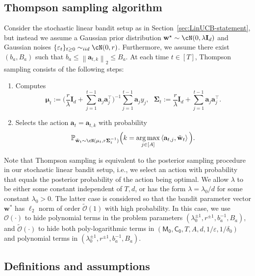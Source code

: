 \documentclass[10pt]{article}
\newcommand{\id}{\bI}
\newcommand{\eps}{\varepsilon}
\DeclareMathOperator*{\argmax}{arg\,max}
\newcommand{\norm}[1]{\left\|{#1}\right\|}
\newcommand{\ltwo}[1]{\norm{#1}_2}
\renewcommand{\cO}{\mathcal{O}}
\newcommand{\<}{\left\langle}
\renewcommand{\>}{\right\rangle}
\renewcommand{\P}{\mathbb{P}}
\newcommand{\Tpsmean}{{{\mathbf\mu}}}
\newcommand{\Tpscov}{{{\mathbf\Sigma}}}
\newcommand{\Tpssam}{{\tilde\bw}}
\newcommand{\Tpspar}{{\lambda}}
\newcommand{\Tpsparn}{{r}}
\newcommand{\tcO}{{\tilde{\mathcal O}}}
\newcommand{\totlen}{{T}}
\newcommand{\neuron}{{\mathsf{M_0}}}
\newcommand{\weightn}{{{\mathsf{C_0}}}}
\def\bI{{\mathbf I}}
\def\ba{{\mathbf a}}
\def\bw{{\mathbf w}}
\begin{document}
\subsection{Thompson sampling algorithm}\label{app:ts_algorithm_formula}
Consider the stochastic linear bandit setup as in Section~\ref{sec:LinUCB-statement}, but instead we assume a  Gaussian prior distribution $\bw^\star\sim \cN(0,\Tpspar\id_d)$ and Gaussian noises $\{ \eps_t \}_{t \ge 0} \sim_{iid} \cN(0,\Tpsparn)$. Furthermore, we assume there exist $(b_a, B_a)$ such that $b_a\leq\ltwo{\ba_{t,k}}\leq B_a$. At each time $t\in[\totlen]$, Thompson sampling consists of the following steps:
\begin{enumerate}
    \item Computes
    \[
    \Tpsmean_t:= \Big(\frac{\Tpsparn}{\Tpspar  }\id_{d}+\sum_{j=1}^{t-1}\ba_j\ba_j^\top \Big)^{-1}\sum_{j=1}^{t-1}\ba_j y_j,~~~
\Tpscov_t:=\frac{\Tpsparn}{\Tpspar  }\id_{d}+\sum_{j=1}^{t-1}\ba_j\ba_j^\top.
\]
\item Selects the action $\ba_{t}=\ba_{t,k}$ with probability
\[
\P_{\Tpssam_t\sim\cN(\Tpsmean_t,\Tpsparn\Tpscov_t^{-1})}\Big(k =\argmax_{j \in[A]}\<\ba_{t,j},\Tpssam_t\> \Big).
\]
\end{enumerate}

Note that Thompson sampling is equivalent to the posterior sampling procedure in our stochastic linear bandit setup, i.e., we select an action with probability that equals  the posterior probability of the action being optimal.  We allow $\Tpspar$ to be either some constant independent of $\totlen,d$,  or has the form $\Tpspar=\Tpspar_0/d$ for some constant $\Tpspar_0>0$.  The latter case is considered so that the bandit parameter vector $\bw^*$ has $\ell_2$ norm of order  $\tcO(1)$ with high probability. In this case, we use $\cO(\cdot)$ to hide polynomial terms in the problem parameters $(\lambda_0^{\pm1},\Tpsparn^{\pm1},b_a^{-1},B_a)$, and $\tcO(\cdot)$ to hide both poly-logarithmic terms in $(\neuron,\weightn,T,A,d,1/\eps,1/\delta_0)$ and polynomial terms in  $(\lambda_0^{\pm1},\Tpsparn^{\pm1},b_a^{-1},B_a)$.





\subsection{Definitions and assumptions}\label{app:thompson_def_ass}
\end{document}

